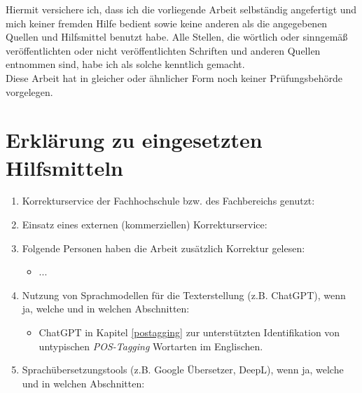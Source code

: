 Hiermit versichere ich, dass ich die vorliegende Arbeit selbständig angefertigt und mich keiner fremden Hilfe bedient sowie keine anderen als die angegebenen Quellen und Hilfsmittel benutzt habe. Alle Stellen, die wörtlich oder sinngemäß veröffentlichten oder nicht veröffentlichten Schriften und anderen Quellen entnommen sind, habe ich als solche kenntlich gemacht.\\

Diese Arbeit hat in gleicher oder ähnlicher Form noch keiner Prüfungsbehörde vorgelegen.\\
\section*{Erklärung zu eingesetzten Hilfsmitteln}
\begin{enumerate}
	\item Korrekturservice der Fachhochschule bzw. des Fachbereichs genutzt:
	\item Einsatz eines externen (kommerziellen) Korrekturservice:
	\item Folgende Personen haben die Arbeit zusätzlich Korrektur gelesen:
	\begin{itemize}
		\item ...
	\end{itemize}
	\item Nutzung von Sprachmodellen für die Texterstellung (z.B. ChatGPT), wenn ja, welche und in welchen Abschnitten:
	\begin{itemize}
		\item ChatGPT in Kapitel \ref{postagging} zur unterstützten Identifikation von untypischen \emph{POS-Tagging} Wortarten im Englischen.
	\end{itemize}
	\item Sprachübersetzungstools (z.B. Google Übersetzer, DeepL), wenn ja, welche und in welchen Abschnitten:

\end{enumerate}
